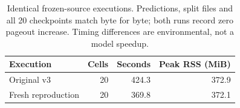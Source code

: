 \begin{table}[htbp]\centering\small
\caption{Identical frozen-source executions. Predictions, split files and all 20 checkpoints match byte for byte; both runs record zero pageout increase. Timing differences are environmental, not a model speedup.}
\begin{tabular}{lrrr}
\toprule
Execution & Cells & Seconds & Peak RSS (MiB) \\
\midrule
Original v3 & 20 & 424.3 & 372.9 \\
Fresh reproduction & 20 & 369.8 & 372.1 \\
\bottomrule
\end{tabular}\end{table}
